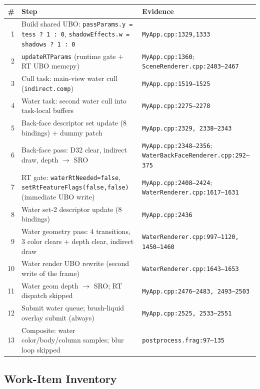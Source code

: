 \documentclass[11pt,a4paper]{article}
\begin{document}
\begin{longtable}{@{}rll@{}}
\toprule
\textbf{\#} & \textbf{Step} & \textbf{Evidence} \\
\midrule
\endhead
1 & Build shared UBO: \texttt{passParams.y = tess ? 1 : 0}, \texttt{shadowEffects.w = shadows ? 1 : 0} & \texttt{MyApp.cpp:1329,1333} \\
2 & \texttt{updateRTParams} (runtime gate $+$ RT UBO memcpy) & \texttt{MyApp.cpp:1360}; \texttt{SceneRenderer.cpp:2403--2467} \\
3 & Cull task: main-view water cull (\texttt{indirect.comp}) & \texttt{MyApp.cpp:1519--1525} \\
4 & Water task: second water cull into task-local buffers & \texttt{MyApp.cpp:2275--2278} \\
5 & Back-face descriptor set update (8 bindings) $+$ dummy patch & \texttt{MyApp.cpp:2329, 2338--2343} \\
6 & Back-face pass: D32 clear, indirect draw, depth $\rightarrow$ SRO & \texttt{MyApp.cpp:2348--2356}; \texttt{WaterBackFaceRenderer.cpp:292--375} \\
7 & RT gate: \texttt{waterRtNeeded=false}, \texttt{setRtFeatureFlags(false,false)} (immediate UBO write) & \texttt{MyApp.cpp:2408--2424}; \texttt{WaterRenderer.cpp:1617--1631} \\
8 & Water set-2 descriptor update (8 bindings) & \texttt{MyApp.cpp:2436} \\
9 & Water geometry pass: 4 transitions, 3 color clears $+$ depth clear, indirect draw & \texttt{WaterRenderer.cpp:997--1120, 1450--1460} \\
10 & Water render UBO rewrite (second write of the frame) & \texttt{WaterRenderer.cpp:1643--1653} \\
11 & Water geom depth $\rightarrow$ SRO; RT dispatch skipped & \texttt{MyApp.cpp:2476--2483, 2493--2503} \\
12 & Submit water queue; brush-liquid overlay submit (always) & \texttt{MyApp.cpp:2525, 2533--2551} \\
13 & Composite: water color/body/column samples; blur loop skipped & \texttt{postprocess.frag:97--135} \\
\bottomrule
\end{longtable}

\subsection{Work-Item Inventory}
\end{document}

